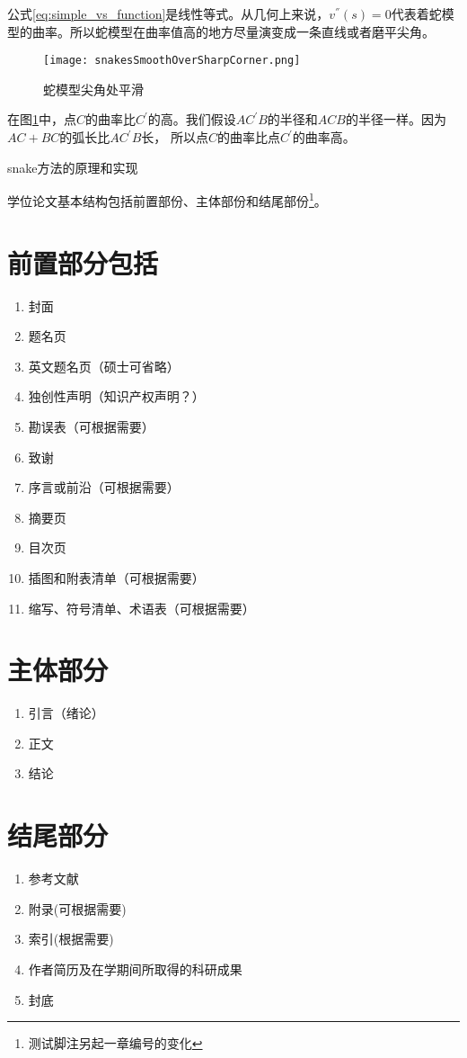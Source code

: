 公式\eqref{eq:simple_vs_function}是线性等式。从几何上来说，$v^{''}(s)=0$代表着蛇模型的曲率。所以蛇模型在曲率值高的地方尽量演变成一条直线或者磨平尖角。

\begin{figure}[htbp]
	\centering
	\texttt{[image: snakesSmoothOverSharpCorner.png]}
	\caption{蛇模型尖角处平滑}\label{fig:snakesSmoothOverSharpCorner}
\end{figure}

在图\ref{fig:snakesSmoothOverSharpCorner}中，点$C$的曲率比$C^{'}$的高。我们假设$AC^{'}B$的半径和$ACB$的半径一样。因为$AC+BC$的弧长比$AC^{'}B$长，
所以点$C$的曲率比点$C^{'}$的曲率高。


snake方法的原理和实现

学位论文基本结构包括前置部份、主体部份和结尾部份\footnote{测试脚注另起一章编号的变化}。
\section{前置部分包括}
\begin{enumerate}
	\item 封面
	\item 题名页
	\item 英文题名页（硕士可省略）
	\item 独创性声明（知识产权声明？）
	\item 勘误表（可根据需要）
	\item 致谢
	\item 序言或前沿（可根据需要）
	\item 摘要页
	\item 目次页
	\item 插图和附表清单（可根据需要）
	\item 缩写、符号清单、术语表（可根据需要）
\end{enumerate}
\section{主体部分}
\begin{enumerate}
	\item 引言（绪论）
	\item 正文
	\item 结论
\end{enumerate}
\section{结尾部分}
\begin{enumerate}
	\item 参考文献
	\item 附录(可根据需要)
	\item 索引(根据需要)
	\item 作者简历及在学期间所取得的科研成果
	\item 封底
\end{enumerate}
